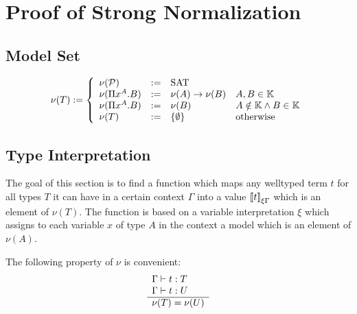 \section{Proof of Strong Normalization}


\subsection{Model Set}

\begin{definition}
$$
    \nu(T) :=
    \left \{
    \begin{array}{llll}
        \nu({\cal P}) &:=& \text{SAT}
        \\
        \nu(\Pi x^A. B) &:=& \nu(A)\to \nu(B) & A,B \in \mathbb{K}
        \\
        \nu(\Pi x^A. B) &:=& \nu(B) & A \notin \mathbb{K} \land B \in \mathbb{K}
        \\
        \nu (T) &:=& {\{\emptyset\}} &\text{otherwise}
    \end{array}
    \right.
$$
\end{definition}


\subsection{Type Interpretation}

The goal of this section is to find a function which maps any welltyped term $t$
for all types $T$ it can have in a certain context $\Gamma$ into a value
${{[\![} t{]\!]}}_{\xi\Gamma}$ which is an element of $\nu (T)$. The function is
based on a variable interpretation $\xi$ which assigns to each variable $x$ of
type $A$ in the context a model which is an element of $\nu(A)$.

The following property of $\nu$ is convenient:
$$
    \begin{array}{l} 
        \Gamma \vdash t: T
        \\
        \Gamma \vdash t: U
     \\ \hline 
        \nu(T) = \nu(U)
    \end{array}
$$
